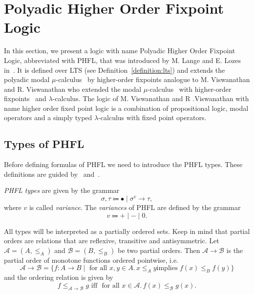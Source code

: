 
\section{Polyadic Higher Order Fixpoint Logic}\label{sec:polyadichigherorderfixpointlogic}

In this section, we present a logic with name Polyadic Higher Order Fixpoint Logic, abbreviated with PHFL, that was
introduced by M. Lange and E. Lozes in~\cite{lange2014capturing}. It is defined over LTS (see
Definition~\ref{definition:lts}) and extends the polyadic modal $\mu$-calculus~\cite{otto1999bisimulation} by
higher-order fixpoints analogue to M. Viswanathan and R. Viswanathan who extended the modal
$\mu$-calculus~\cite{kozen1983results} with higher-order fixpoints~\cite{viswanathan2004higher} and $\lambda$-calculus. The logic of M. Viswanathan and R
.Viswanathan with name higher order fixed point logic is a combination of propositional logic, modal operators and
a simply typed $\lambda$-calculus with fixed point operators. 

\subsection{Types of PHFL}\label{subsec:phflTypes}

Before defining formulas of PHFL we need to introduce the PHFL types. These definitions are guided
by~\cite{viswanathan2004higher} and~\cite{lange2014capturing}.

\begin{definition}
    \emph{PHFL types} are given by the grammar
    \[\sigma, \tau \Coloneqq \bullet \mid \sigma^v \rightarrow \tau,\]
    where $v$ is called \textit{variance}. The \emph{variances} of PHFL are defined by the grammar
    \[v \Coloneqq + \mid - \mid 0.\]
\end{definition}

All types will be interpreted as a partially ordered sets. Keep in mind that partial orders are relations that are reflexive, transitive
and antisymmetric. Let $\mathcal{A} = (A, \leq_A)$ and $\mathcal{B} = (B, \leq_B)$ be two partial orders. Then
$\mathcal{A} \rightarrow \mathcal{B}$ is the partial order of monotone functions ordered pointwise, i.e.
\[\mathcal{A} \rightarrow \mathcal{B} = \{f\colon A\rightarrow B \mid \text{ for all } x,y \in A.\,x\leq_A y \text{
implies }
f(x)
\leq_B f(y)\}\]
and the ordering relation is given by
\[f \leq_{\mathcal{A}\rightarrow\mathcal{B}} g\text{ iff } \text{ for all } x\in \mathcal{A}.\,f(x) \leq_{\mathcal{B}} g
(x).\]

